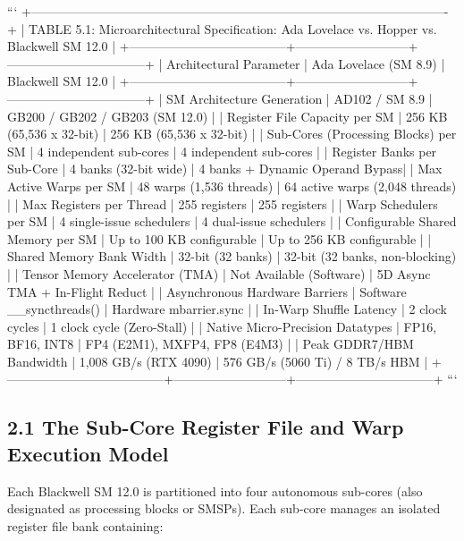\documentclass[11pt,twoside,openright]{amsbook}
\begin{document}
{{{{{{```
+----------------------------------------------------------------------------------------------------+
| TABLE 5.1: Microarchitectural Specification: Ada Lovelace vs. Hopper vs. Blackwell SM 12.0         |
+--------------------------------------+---------------------------+---------------------------------+
| Architectural Parameter              | Ada Lovelace (SM 8.9)     | Blackwell SM 12.0               |
+--------------------------------------+---------------------------+---------------------------------+
| SM Architecture Generation           | AD102 / SM 8.9            | GB200 / GB202 / GB203 (SM 12.0) |
| Register File Capacity per SM        | 256 KB (65,536 x 32-bit)  | 256 KB (65,536 x 32-bit)        |
| Sub-Cores (Processing Blocks) per SM | 4 independent sub-cores   | 4 independent sub-cores         |
| Register Banks per Sub-Core          | 4 banks (32-bit wide)     | 4 banks + Dynamic Operand Bypass|
| Max Active Warps per SM              | 48 warps (1,536 threads)  | 64 active warps (2,048 threads) |
| Max Registers per Thread             | 255 registers             | 255 registers                   |
| Warp Schedulers per SM               | 4 single-issue schedulers | 4 dual-issue schedulers         |
| Configurable Shared Memory per SM    | Up to 100 KB configurable | Up to 256 KB configurable       |
| Shared Memory Bank Width             | 32-bit (32 banks)         | 32-bit (32 banks, non-blocking) |
| Tensor Memory Accelerator (TMA)      | Not Available (Software)  | 5D Async TMA + In-Flight Reduct |
| Asynchronous Hardware Barriers       | Software __syncthreads()  | Hardware mbarrier.sync          |
| In-Warp Shuffle Latency              | 2 clock cycles            | 1 clock cycle (Zero-Stall)      |
| Native Micro-Precision Datatypes     | FP16, BF16, INT8          | FP4 (E2M1), MXFP4, FP8 (E4M3)   |
| Peak GDDR7/HBM Bandwidth             | 1,008 GB/s (RTX 4090)     | 576 GB/s (5060 Ti) / 8 TB/s HBM |
+--------------------------------------+---------------------------+---------------------------------+
```

\subsection{2.1 The Sub-Core Register File and Warp Execution Model}

Each Blackwell SM 12.0 is partitioned into four autonomous sub-cores (also designated as processing blocks or SMSPs). Each sub-core manages an isolated register file bank containing:

}}}}}}
\end{document}
